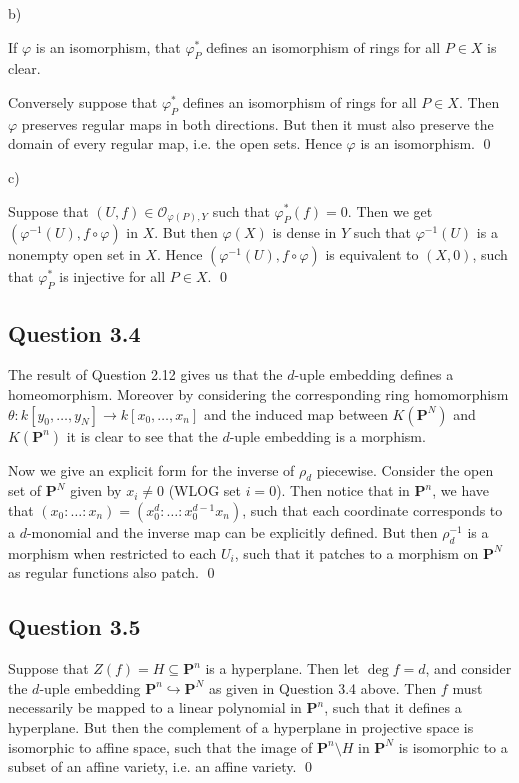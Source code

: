 \documentclass{article}
\begin{document}
\noindent b)

If $\varphi$ is an isomorphism, that $\varphi_P^*$ defines an isomorphism of rings for all $P \in X$ is clear.

Conversely suppose that $\varphi_P^*$ defines an isomorphism of rings for all $P \in X$. Then $\varphi$ preserves regular maps in both directions. But then it must also preserve the domain of every regular map, i.e. the open sets. Hence $\varphi$ is an isomorphism. \qed

\noindent c)

Suppose that $(U,f) \in \mathcal{O}_{\varphi(P),Y}$ such that $\varphi_{P}^* (f) = 0$. Then we get $(\varphi^{-1}(U), f \circ \varphi)$ in $X$. But then $\varphi(X)$ is dense in $Y$ such that $\varphi^{-1}(U)$ is a nonempty open set in $X$. Hence $(\varphi^{-1}(U), f \circ \varphi)$ is equivalent to $(X,0)$, such that $\varphi_P^*$ is injective for all $P \in X$. \qed
\lspace

\subsection*{Question 3.4}

The result of Question 2.12 gives us that the $d$-uple embedding defines a homeomorphism. Moreover by considering the corresponding ring homomorphism $\theta: k[y_0,\dots,y_N] \to k[x_0,\dots,x_n]$ and the induced map between $K(\mathbf{P}^N)$ and $K(\mathbf{P}^n)$ it is clear to see that the $d$-uple embedding is a morphism.

Now we give an explicit form for the inverse of $\rho_d$ piecewise. Consider the open set of $\mathbf{P}^N$ given by $x_i \neq 0$ (WLOG set $i=0$). Then notice that in $\mathbf{P}^n$, we have that $(x_0 : \dots : x_n) = (x_0^d : \dots : x_0^{d-1}x_n)$, such that each coordinate corresponds to a $d$-monomial and the inverse map can be explicitly defined. But then $\rho_d^{-1}$ is a morphism when restricted to each $U_i$, such that it patches to a morphism on $\mathbf{P}^N$ as regular functions also patch. \qed
\lspace

\subsection*{Question 3.5}

Suppose that $Z(f) = H \subseteq \mathbf{P}^n$ is a hyperplane. Then let $\deg f = d$, and consider the $d$-uple embedding $\mathbf{P}^n \hookrightarrow \mathbf{P}^N$ as given in Question 3.4 above. Then $f$ must necessarily be mapped to a linear polynomial in $\mathbf{P}^n$, such that it defines a hyperplane. But then the complement of a hyperplane in projective space is isomorphic to affine space, such that the image of $\mathbf{P}^n \setminus H$ in $\mathbf{P}^N$ is isomorphic to a subset of an affine variety, i.e. an affine variety. \qed
\lspace
\end{document}
